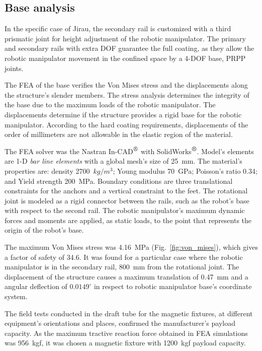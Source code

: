 \subsection{Base analysis}

In the specific case of Jirau, the secondary rail is customized with a third
prismatic joint for height adjustment of the robotic manipulator. The primary
and secondary rails with extra DOF guarantee the full coating, as they allow the
robotic manipulator movement in the confined space by a 4-DOF base, PRPP joints.

The FEA of the base verifies the Von Mises stress and the displacements
along the structure's slender members. The stress analysis determines the
integrity of the base due to the maximum loads of the robotic manipulator. The
displacements determine if the structure provides a rigid base for the robotic
manipulator. According to the hard coating requirements, displacements of the
order of millimeters are not allowable in the elastic region of the
material. 

The FEA solver was the Nastran In-CAD$^{\mbox{\small\textregistered}}$ with
SolidWorks$^{\mbox{\small\textregistered}}$. Model's elements are 1-D 
\textit{bar line elements} with a global mesh's size of 25~mm. The material's
properties are: density 2700~$kg/m^3$; Young modulus 70~GPa; Poisson's ratio
0.34; and Yield strength 200~MPa. Boundary conditions are three translational
constraints for the anchors and a vertical constraint to the feet. The
rotational joint is modeled as a rigid connector between the rails, such as the
robot's base with respect to the second rail. The robotic manipulator's maximum
dynamic forces and moments are applied, as static loads, to the point that
represents the origin of the robot's base.

The maximum Von Mises stress was 4.16~MPa (Fig.~\ref{fig:von_mises}), which
gives a factor of safety of 34.6. It was found for a particular case where the robotic manipulator is in
the secondary rail, 800~mm from the rotational joint. The displacement of the
structure causes a maximum translation of 0.47~mm and a angular deflection of
$0.0149^{\circ}$ in respect to robotic manipulator base's coordinate system. 

The field tests conducted in the draft tube for the magnetic fixtures, at
different equipment's orientations and places, confirmed the manufacturer's
payload capacity. As the maximum tractive reaction force obtained in FEA
simulations was 956~kgf, it was chosen a magnetic fixture with 1200~kgf
payload capacity.

